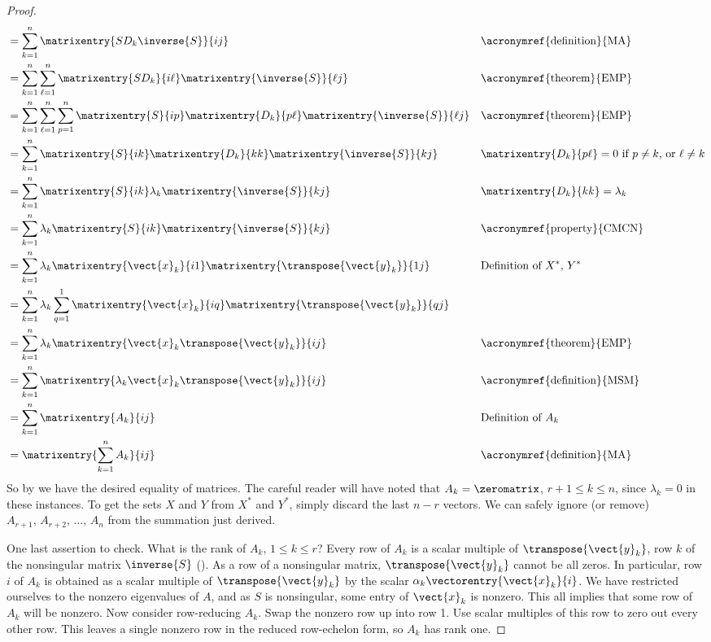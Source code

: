 \begin{proof}
\begin{align*}
%
&=\sum_{k=1}^{n}\matrixentry{SD_k\inverse{S}}{ij}
&&\text{\acronymref{definition}{MA}}\\
%
&=\sum_{k=1}^{n}\sum_{\ell=1}^{n}\matrixentry{SD_k}{i\ell}\matrixentry{\inverse{S}}{\ell j}
&&\text{\acronymref{theorem}{EMP}}\\
%
&=\sum_{k=1}^{n}\sum_{\ell=1}^{n}\sum_{p=1}^{n}
\matrixentry{S}{ip}\matrixentry{D_k}{p\ell}\matrixentry{\inverse{S}}{\ell j}
&&\text{\acronymref{theorem}{EMP}}\\
%
&=\sum_{k=1}^{n}
\matrixentry{S}{ik}\matrixentry{D_k}{kk}\matrixentry{\inverse{S}}{kj}
&&\text{$\matrixentry{D_k}{p\ell}=0$ if $p\neq k$, or $\ell\neq k$}\\
%
&=\sum_{k=1}^{n}
\matrixentry{S}{ik}\lambda_k\matrixentry{\inverse{S}}{kj}
&&\matrixentry{D_k}{kk}=\lambda_k\\
%
&=\sum_{k=1}^{n}\lambda_k\matrixentry{S}{ik}\matrixentry{\inverse{S}}{kj}
&&\text{\acronymref{property}{CMCN}}\\
%
&=\sum_{k=1}^{n}\lambda_k\matrixentry{\vect{x}_k}{i1}\matrixentry{\transpose{\vect{y}_k}}{1j}
&&\text{Definition of $X^\ast$, $Y^\ast$}\\
%
&=\sum_{k=1}^{n}\lambda_k\sum_{q=1}^{1}\matrixentry{\vect{x}_k}{iq}\matrixentry{\transpose{\vect{y}_k}}{qj}\\
%
&=\sum_{k=1}^{n}\lambda_k\matrixentry{\vect{x}_k\transpose{\vect{y}_k}}{ij}&&\text{\acronymref{theorem}{EMP}}\\
%
&=\sum_{k=1}^{n}\matrixentry{\lambda_k\vect{x}_k\transpose{\vect{y}_k}}{ij}&&\text{\acronymref{definition}{MSM}}\\
%
&=\sum_{k=1}^{n}\matrixentry{A_k}{ij}&&\text{Definition of $A_k$}\\
%
&=\matrixentry{\sum_{k=1}^{n}A_k}{ij}&&\text{\acronymref{definition}{MA}}\\
%
\end{align*}
%
So by  we have the desired equality of matrices.  The careful reader will have noted that $A_k=\zeromatrix$, $r+1\leq k\leq n$, since $\lambda_k=0$ in these instances.  To get the sets $X$ and $Y$ from $X^\ast$ and $Y^\ast$, simply discard the last $n-r$ vectors.  We can safely ignore (or remove) $A_{r+1},\,A_{r+2},\,\dots,\,A_n$ from the summation just derived.\par
%
One last assertion to check.  What is the rank of $A_k$, $1\leq k\leq r$?   Every row of $A_k$ is a scalar multiple of $\transpose{\vect{y}_k}$, row $k$ of the nonsingular matrix $\inverse{S}$ ().  As a row of a nonsingular matrix, $\transpose{\vect{y}_k}$ cannot be all zeros.  In particular, row $i$ of $A_k$ is obtained as a scalar multiple of $\transpose{\vect{y}_k}$ by the scalar $\alpha_k\vectorentry{\vect{x}_k}{i}$.  We have restricted ourselves to the nonzero eigenvalues of $A$, and as $S$ is nonsingular, some entry of $\vect{x}_k$ is nonzero.  This all implies that some row of $A_k$ will be nonzero.  Now consider row-reducing $A_k$.  Swap the nonzero row up into row 1.  Use scalar multiples of this row to zero out every other row.  This leaves a single nonzero row in the reduced row-echelon form, so $A_k$ has rank one.
%
\end{proof}
